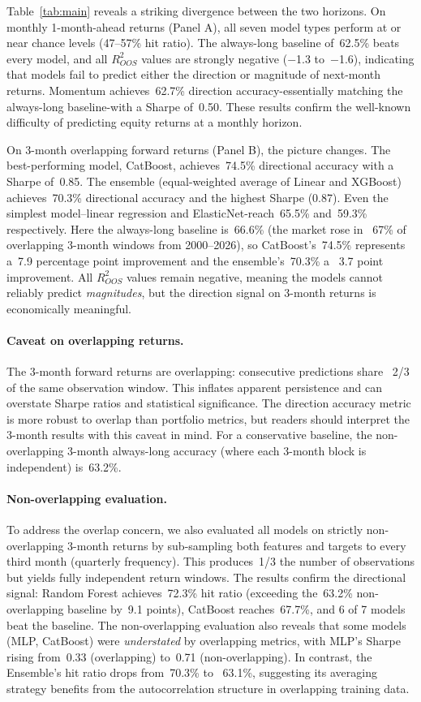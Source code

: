 \documentclass{article}
\begin{document}
Table~\ref{tab:main} reveals a striking divergence between the two horizons.
On monthly 1-month-ahead returns (Panel A), all seven model types perform at
or near chance levels (47--57\% hit ratio). The always-long baseline of~62.5\%
beats every model, and all $R^2_{OOS}$ values are strongly negative
($-$1.3 to~$-$1.6), indicating that models fail to predict either the
direction or magnitude of next-month returns. Momentum achieves~62.7\%
direction accuracy-essentially matching the always-long baseline-with a
Sharpe of~0.50. These results confirm the well-known difficulty of predicting
equity returns at a monthly horizon.

On 3-month overlapping forward returns (Panel B), the picture changes. The
best-performing model, CatBoost, achieves~74.5\% directional accuracy with a
Sharpe of~0.85. The ensemble (equal-weighted average of Linear and XGBoost)
achieves~70.3\% directional accuracy and the highest Sharpe (0.87). Even the
simplest model--linear regression and ElasticNet-reach~65.5\% and~59.3\%
respectively. Here the always-long baseline is~66.6\% (the market rose in
~67\% of overlapping 3-month windows from 2000--2026), so CatBoost's~74.5\%
represents a~7.9 percentage point improvement and the ensemble's~70.3\% a
~3.7 point improvement. All $R^2_{OOS}$ values remain negative, meaning the
models cannot reliably predict \emph{magnitudes}, but the direction signal on
3-month returns is economically meaningful.

\paragraph{Caveat on overlapping returns.}
The 3-month forward returns are overlapping: consecutive predictions share
~2/3 of the same observation window. This inflates apparent persistence and
can overstate Sharpe ratios and statistical significance. The direction
accuracy metric is more robust to overlap than portfolio metrics, but readers
should interpret the 3-month results with this caveat in mind. For a
conservative baseline, the non-overlapping 3-month always-long accuracy
(where each 3-month block is independent) is~63.2\%.

\paragraph{Non-overlapping evaluation.}
To address the overlap concern, we also evaluated all models on strictly
non-overlapping 3-month returns by sub-sampling both features and targets
to every third month (quarterly frequency). This produces~1/3 the number
of observations but yields fully independent return windows. The results
confirm the directional signal: Random Forest achieves~72.3\% hit ratio
(exceeding the~63.2\% non-overlapping baseline by~9.1 points), CatBoost
reaches~67.7\%, and 6 of 7 models beat the baseline. The non-overlapping
evaluation also reveals that some models (MLP, CatBoost) were \emph{understated}
by overlapping metrics, with MLP's Sharpe rising from~0.33 (overlapping) to~0.71
(non-overlapping). In contrast, the Ensemble's hit ratio drops from~70.3\% to
~63.1\%, suggesting its averaging strategy benefits from the autocorrelation
structure in overlapping training data.
\end{document}
